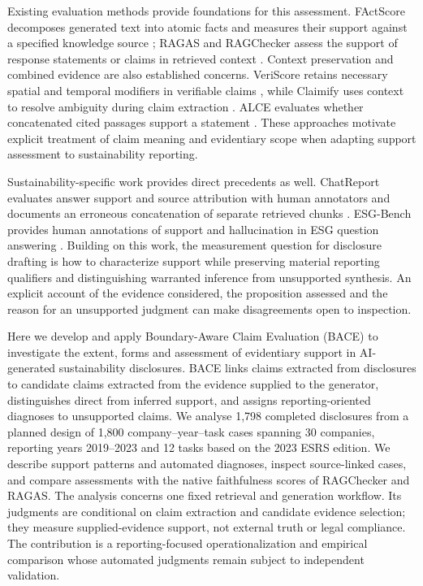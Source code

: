 \documentclass[11pt,a4paper]{article}
\begin{document}
Existing evaluation methods provide foundations for this assessment. FActScore decomposes generated text into atomic facts and measures their support against a specified knowledge source \cite{factscore2023}; RAGAS and RAGChecker assess the support of response statements or claims in retrieved context \cite{ragas2024,ragchecker2024}. Context preservation and combined evidence are also established concerns. VeriScore retains necessary spatial and temporal modifiers in verifiable claims \cite{veriscore2024}, while Claimify uses context to resolve ambiguity during claim extraction \cite{claimify2025}. ALCE evaluates whether concatenated cited passages support a statement \cite{alce2023}. These approaches motivate explicit treatment of claim meaning and evidentiary scope when adapting support assessment to sustainability reporting.

Sustainability-specific work provides direct precedents as well. ChatReport evaluates answer support and source attribution with human annotators and documents an erroneous concatenation of separate retrieved chunks \cite{chatreport2023}. ESG-Bench provides human annotations of support and hallucination in ESG question answering \cite{esgbench2026}. Building on this work, the measurement question for disclosure drafting is how to characterize support while preserving material reporting qualifiers and distinguishing warranted inference from unsupported synthesis. An explicit account of the evidence considered, the proposition assessed and the reason for an unsupported judgment can make disagreements open to inspection.

Here we develop and apply Boundary-Aware Claim Evaluation (BACE) to investigate the extent, forms and assessment of evidentiary support in AI-generated sustainability disclosures. BACE links claims extracted from disclosures to candidate claims extracted from the evidence supplied to the generator, distinguishes direct from inferred support, and assigns reporting-oriented diagnoses to unsupported claims. We analyse 1,798 completed disclosures from a planned design of 1,800 company--year--task cases spanning 30 companies, reporting years 2019--2023 and 12 tasks based on the 2023 ESRS edition. We describe support patterns and automated diagnoses, inspect source-linked cases, and compare assessments with the native faithfulness scores of RAGChecker and RAGAS. The analysis concerns one fixed retrieval and generation workflow. Its judgments are conditional on claim extraction and candidate evidence selection; they measure supplied-evidence support, not external truth or legal compliance. The contribution is a reporting-focused operationalization and empirical comparison whose automated judgments remain subject to independent validation.
\end{document}
